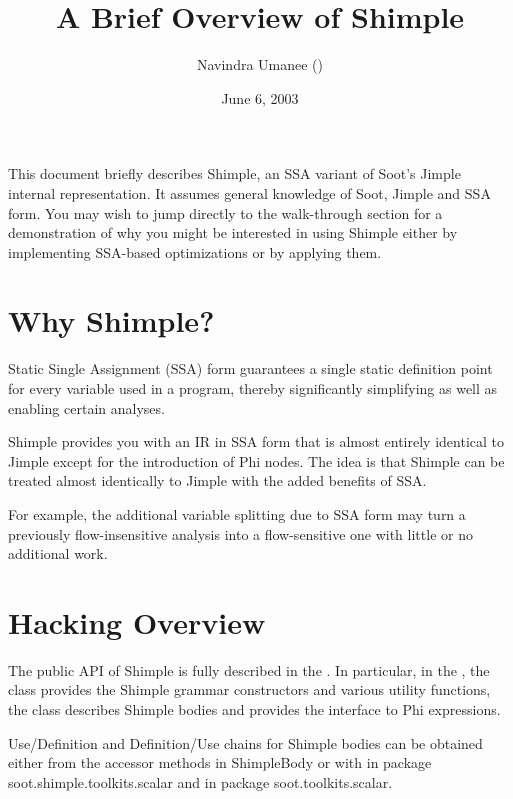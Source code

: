 \documentclass[10pt,letterpaper,oneside,onecolumn]{article}
\title{A Brief Overview of Shimple}
\author{Navindra Umanee
(\htmladdnormallink{navindra@cs.mcgill.ca}{mailto:navindra@cs.mcgill.ca})}
\date{June 6, 2003}
\begin{document}
\maketitle

This document briefly describes Shimple, an SSA variant of Soot's
Jimple internal representation.  It assumes general knowledge of Soot,
Jimple and SSA form. You may wish to jump directly to the walk-through
section for a demonstration of why you might be interested in using
Shimple either by implementing SSA-based optimizations or by applying
them.

\section{Why Shimple?}

Static Single Assignment (SSA) form guarantees a single static
definition point for every variable used in a program, thereby
significantly simplifying as well as enabling certain analyses.

Shimple provides you with an IR in SSA form that is almost entirely
identical to Jimple except for the introduction of Phi nodes.  The
idea is that Shimple can be treated almost identically to Jimple with
the added benefits of SSA.  

For example, the additional variable splitting due to SSA form may
turn a previously flow-insensitive analysis into a flow-sensitive one
with little or no additional work.

\section{Hacking Overview}

The public API of Shimple is fully described in the
.  In particular,
in the ,
the
class provides the Shimple grammar constructors and various utility
functions, the
class describes Shimple bodies and
provides the interface to Phi expressions.

Use/Definition and Definition/Use chains for Shimple bodies can be
obtained either from the accessor methods in ShimpleBody or with
in package soot.shimple.toolkits.scalar and
in package soot.toolkits.scalar.
\end{document}
